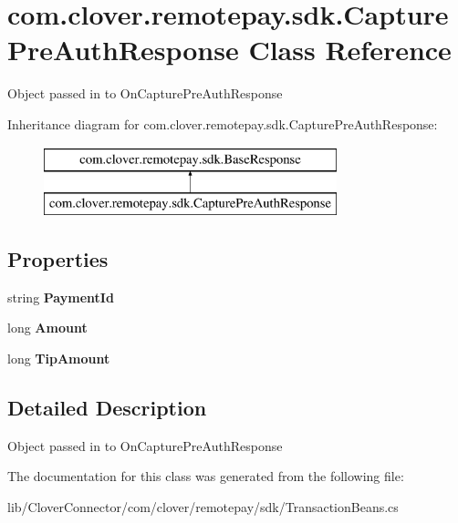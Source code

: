 \hypertarget{classcom_1_1clover_1_1remotepay_1_1sdk_1_1_capture_pre_auth_response}{}\section{com.\+clover.\+remotepay.\+sdk.\+Capture\+Pre\+Auth\+Response Class Reference}
\label{classcom_1_1clover_1_1remotepay_1_1sdk_1_1_capture_pre_auth_response}


Object passed in to On\+Capture\+Pre\+Auth\+Response  


Inheritance diagram for com.\+clover.\+remotepay.\+sdk.\+Capture\+Pre\+Auth\+Response\+:\begin{figure}[H]
\begin{center}
\leavevmode
\includegraphics[height=2.000000cm]{classcom_1_1clover_1_1remotepay_1_1sdk_1_1_capture_pre_auth_response}
\end{center}
\end{figure}
\subsection*{Properties}
\begin{DoxyCompactItemize}
\item 
\mbox{\label{classcom_1_1clover_1_1remotepay_1_1sdk_1_1_capture_pre_auth_response_a41045a580e984f23511756347661a879}} 
string {\bfseries Payment\+Id}
\item 
\mbox{\label{classcom_1_1clover_1_1remotepay_1_1sdk_1_1_capture_pre_auth_response_a3298ac5c9d04049212f5f78fb16fd7dc}} 
long {\bfseries Amount}
\item 
\mbox{\label{classcom_1_1clover_1_1remotepay_1_1sdk_1_1_capture_pre_auth_response_a0ecf754c393aeaca1e0c6c1ea7c9a406}} 
long {\bfseries Tip\+Amount}
\end{DoxyCompactItemize}


\subsection{Detailed Description}
Object passed in to On\+Capture\+Pre\+Auth\+Response 



The documentation for this class was generated from the following file\+:\begin{DoxyCompactItemize}
\item 
lib/\+Clover\+Connector/com/clover/remotepay/sdk/Transaction\+Beans.\+cs\end{DoxyCompactItemize}
